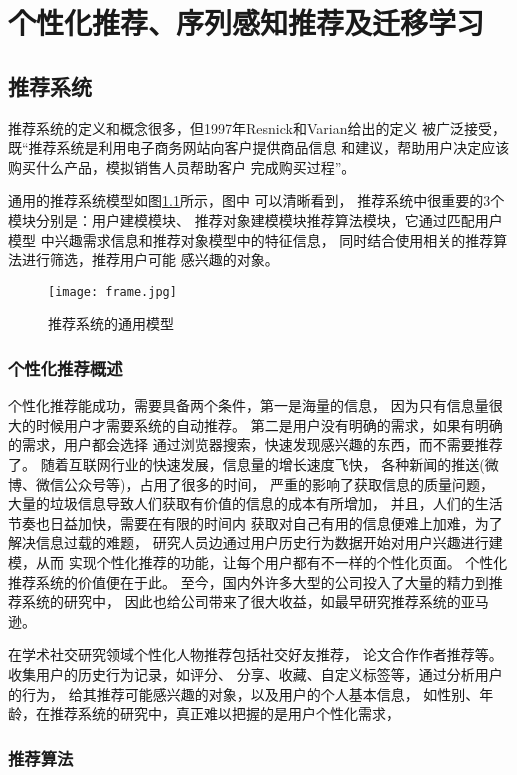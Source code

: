 ﻿%
\chapter{个性化推荐、序列感知推荐及迁移学习}
\section{推荐系统}
推荐系统的定义和概念很多，但1997年Resnick和Varian给出的定义%
被广泛接受，既“推荐系统是利用电子商务网站向客户提供商品信息%
和建议，帮助用户决定应该购买什么产品，模拟销售人员帮助客户%
完成购买过程”。%

通用的推荐系统模型如图\ref{fig:frame}所示，图中%
可以清晰看到，%
推荐系统中很重要的3个模块分别是：用户建模模块、%
推荐对象建模模块推荐算法模块，它通过匹配用户模型%
中兴趣需求信息和推荐对象模型中的特征信息，%
同时结合使用相关的推荐算法进行筛选，推荐用户可能%
感兴趣的对象。
\begin{figure}[htbp] %
  \centering
  \texttt{[image: frame.jpg]}
  \caption{推荐系统的通用模型}
  \label{fig:frame}
\end{figure}




\subsection{个性化推荐概述}
个性化推荐能成功，需要具备两个条件，第一是海量的信息，%
因为只有信息量很大的时候用户才需要系统的自动推荐。%
第二是用户没有明确的需求，如果有明确的需求，用户都会选择%
通过浏览器搜索，快速发现感兴趣的东西，而不需要推荐了。%
随着互联网行业的快速发展，信息量的增长速度飞快，%
各种新闻的推送(微博、微信公众号等)，占用了很多的时间，%
严重的影响了获取信息的质量问题，%
大量的垃圾信息导致人们获取有价值的信息的成本有所增加，%
并且，人们的生活节奏也日益加快，需要在有限的时间内%
获取对自己有用的信息便难上加难，为了解决信息过载的难题，%
研究人员边通过用户历史行为数据开始对用户兴趣进行建模，从而%
实现个性化推荐的功能，让每个用户都有不一样的个性化页面。%
个性化推荐系统的价值便在于此。%
至今，国内外许多大型的公司投入了大量的精力到推荐系统的研究中，%
因此也给公司带来了很大收益，如最早研究推荐系统的亚马逊。%

在学术社交研究领域个性化人物推荐包括社交好友推荐，%
论文合作作者推荐等。收集用户的历史行为记录，如评分、%
分享、收藏、自定义标签等，通过分析用户的行为，%
给其推荐可能感兴趣的对象，以及用户的个人基本信息，%
如性别、年龄，在推荐系统的研究中，真正难以把握的是用户个性化需求，
\subsection{推荐算法}



